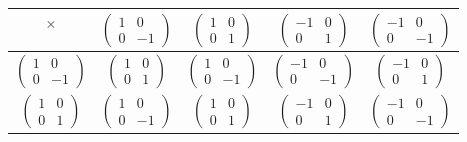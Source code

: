 \documentclass{amsbook}
\begin{document}
		\begin{figure}[t]
			\begin{tabular}{c|cccc}
				$\times$ & $\begin{pmatrix} 1 & 0 \\ 0 & -1 \end{pmatrix}$ & $\begin{pmatrix} 1 & 0 \\ 0 & 1 \end{pmatrix}$ & $\begin{pmatrix} -1 & 0 \\ 0 & 1 \end{pmatrix}$ & $\begin{pmatrix} -1 & 0 \\ 0 & -1 \end{pmatrix}$ \\
				\hline
				$\begin{pmatrix} 1 & 0 \\ 0 & -1 \end{pmatrix}$ & \color{red}$\begin{pmatrix} 1 & 0 \\ 0 & 1 \end{pmatrix}$\color{black} & $\begin{pmatrix} 1 & 0 \\ 0 & -1 \end{pmatrix}$ & $\begin{pmatrix} -1 & 0 \\ 0 & -1 \end{pmatrix}$ & $\begin{pmatrix} -1 & 0 \\ 0 & 1 \end{pmatrix}$ \\
				$\begin{pmatrix} 1 & 0 \\ 0 & 1 \end{pmatrix}$ & $\begin{pmatrix} 1 & 0 \\ 0 & -1 \end{pmatrix}$ & \color{red}$\begin{pmatrix} 1 & 0 \\ 0 & 1 \end{pmatrix}$\color{black} & $\begin{pmatrix} -1 & 0 \\ 0 & 1 \end{pmatrix}$ & $\begin{pmatrix} -1 & 0 \\ 0 & -1 \end{pmatrix}$ \\

\end{tabular}
\end{figure}
\end{document}
